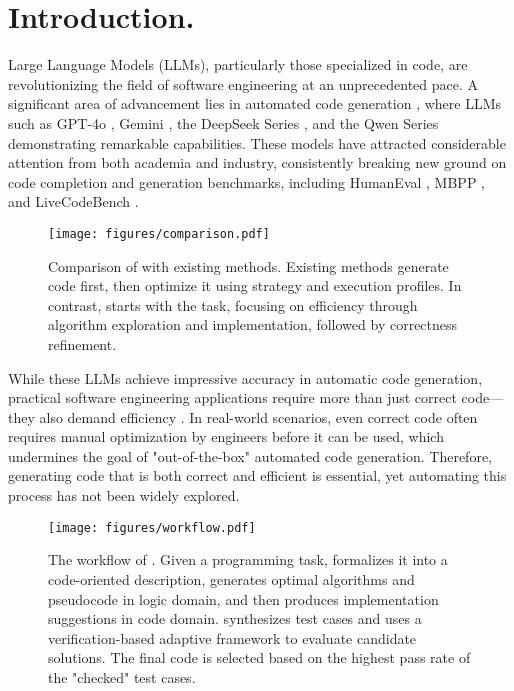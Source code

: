 \section{Introduction.}
Large Language Models (LLMs), particularly those specialized in code, are revolutionizing the field of software engineering at an unprecedented pace. A significant area of advancement lies in automated code generation \cite{evalplus}, where LLMs such as GPT-4o \cite{openai2024gpt4ocard}, Gemini \cite{team2023gemini}, the DeepSeek Series \cite{deepseekv2}, and the Qwen Series \cite{qwen2, qwen2.5} demonstrating remarkable capabilities. These models have attracted considerable attention from both academia and industry, consistently breaking new ground on code completion and generation benchmarks, including HumanEval \cite{chen2021evaluating}, MBPP \cite{austin2021program}, and LiveCodeBench \cite{jain2024livecodebench}.

\begin{figure}
    \centering
    \texttt{[image: figures/comparison.pdf]}
    \caption{Comparison of \tool with existing methods. Existing methods generate code first, then optimize it using strategy and execution profiles. In contrast, \tool starts with the task, focusing on efficiency through algorithm exploration and implementation, followed by correctness refinement.}
    \label{fig:comparison}
\end{figure}

While these LLMs achieve impressive accuracy in automatic code generation, practical software engineering applications require more than just correct code—they also demand efficiency \cite{shi2024efficientgreenlargelanguage,niu2024evaluatingefficiencysourcecode}. In real-world scenarios, even correct code often requires manual optimization by engineers before it can be used, which undermines the goal of "out-of-the-box" automated code generation. Therefore, generating code that is both correct and efficient is essential, yet automating this process has not been widely explored.

\begin{figure*}
    \centering
    \texttt{[image: figures/workflow.pdf]}
    \caption{The workflow of \tool. Given a programming task, \tool formalizes it into a code-oriented description, generates optimal algorithms and pseudocode in logic domain, and then produces implementation suggestions in code domain. \tool synthesizes test cases and uses a verification-based adaptive framework to evaluate candidate solutions. The final code is selected based on the highest pass rate of the "checked" test cases.}
    \label{fig:workflow}
\end{figure*}

